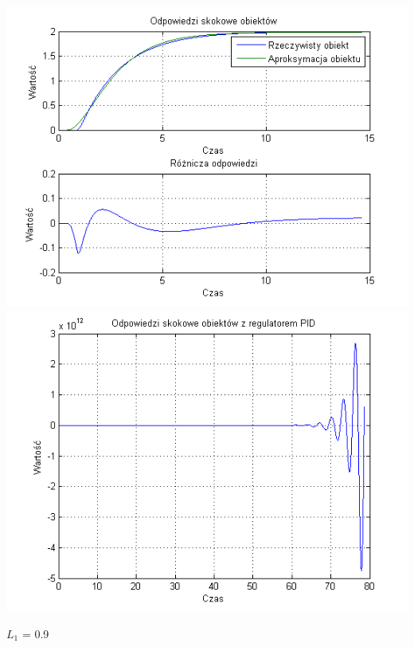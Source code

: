 \documentclass[10pt,a4paper]{article}
\begin{document}
\begin{center}
\includegraphics[scale=1]{images/dwa/skrypt_185.png}\\
\includegraphics[scale=1]{images/dwa/skrypt_186.png}\\
\end{center}
\newpage
$L_1$ = 0.9
\end{document}
